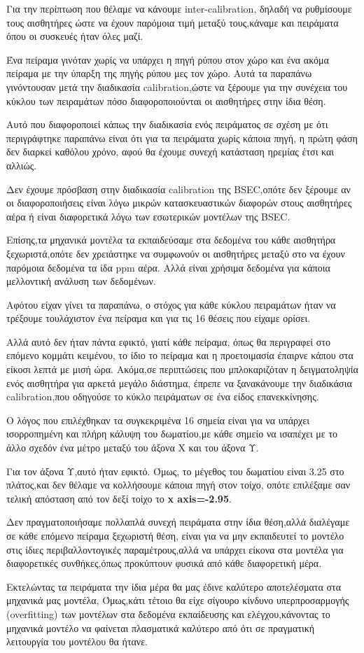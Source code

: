 Για την περίπτωση που θέλαμε να κάνουμε inter-calibration, δηλαδή να ρυθμίσουμε τους
αισθητήρες ώστε να έχουν παρόμοια τιμή μεταξύ τους,κάναμε και πειράματα
όπου οι συσκευές ήταν όλες μαζί.

Ένα πείραμα γινόταν χωρίς να υπάρχει η πηγή ρύπου στον χώρο και ένα ακόμα πείραμα με
την ύπαρξη της πηγής ρύπου μες τον χώρο.
Αυτά τα παραπάνω γινόντουσαν μετά την διαδικασία calibration,ώστε να ξέρουμε για την
συνέχεια του κύκλου των πειραμάτων πόσο διαφοροποιούνται οι αισθητήρες στην ίδια
θέση.

Αυτό που διαφοροποιεί κάπως την διαδικασία ενός πειράματος σε σχέση με ότι
περιγράφτηκε παραπάνω είναι ότι για τα πειράματα χωρίς κάποια πηγή,
η πρώτη φάση δεν διαρκεί καθόλου χρόνο, αφού θα έχουμε συνεχή κατάσταση ηρεμίας
έτσι και αλλιώς.

Δεν έχουμε πρόσβαση στην διαδικασία calibration της BSEC,οπότε δεν ξέρουμε αν οι
διαφοροποιήσεις είναι λόγω μικρών κατασκευαστικών διαφορών στους αισθητήρες αέρα ή
είναι διαφορετικά λόγω των εσωτερικών μοντέλων της BSEC.

Επίσης,τα μηχανικά μοντέλα τα εκπαιδεύσαμε στα δεδομένα του κάθε αισθητήρα
ξεχωριστά,οπότε δεν χρειάστηκε να συμφωνούν οι αισθητήρες μεταξύ στο να έχουν
παρόμοια δεδομένα τα ίδα ppm αέρα.
Αλλά είναι χρήσιμα δεδομένα για κάποια μελλοντική ανάλυση των δεδομένων.

Αφότου είχαν γίνει τα παραπάνω, ο στόχος για κάθε κύκλου πειραμάτων ήταν να τρέξουμε
τουλάχιστον ένα πείραμα και για τις 16 θέσεις που είχαμε ορίσει.

Αλλά αυτό δεν ήταν πάντα εφικτό, γιατί κάθε πείραμα, όπως θα περιγραφεί στο επόμενο
κομμάτι κειμένου, το ίδιο το πείραμα και η προετοιμασία έπαιρνε κάπου στα είκοσι λεπτά
με μισή ώρα.
Ακόμα,σε περιπτώσεις που μπλοκαριζόταν η δειγματοληψία ενός αισθητήρα για αρκετά
μεγάλο διάστημα, έπρεπε να ξανακάνουμε την διαδικάσια calibration,που οδηγούσε το
κύκλο πειράματων σε ένα είδος επανεκκίνησης.

Ο λόγος που επιλέχθηκαν τα συγκεκριμένα 16 σημεία είναι για να υπάρχει ισορροπημένη  και
πλήρη κάλυψη του δωματίου,με κάθε σημείο να ισαπέχει με το άλλο σχεδόν ένα μέτρο
μεταξύ του άξονα Χ και του άξονα Υ.

Για τον άξονα Υ,αυτό ήταν εφικτό.
Όμως, το μέγεθος του δωματίου είναι 3.25 στο πλάτος,και δεν θέλαμε να κολλήσουμε
κάποια πηγή στον τοίχο, οπότε επιλέξαμε σαν τελική απόσταση από τον δεξί τοίχο το
\textbf{x axis=-2.95}.

Δεν πραγματοποιήσαμε πολλαπλά συνεχή πειράματα στην ίδια θέση,αλλά διαλέγαμε σε κάθε επόμενο πείραμα ξεχωριστή θέση,
είναι για να μην εκπαιδευτεί το μοντέλο στις ίδιες περιβαλλοντογικές παραμέτρους,αλλά να υπάρχει
είκονα στα μοντέλα για διαφορετικές συνθήκες,όπως προκύπτουν φυσικά από κάθε διαφορετική μέρα.

Εκτελώντας τα πειράματα την ίδια μέρα θα μας έδινε καλύτερο αποτελέσματα στα μηχανικά μας μοντέλα,
Όμως,κάτι τέτοιο θα είχε σίγουρο κίνδυνο υπερπροσαρμογής (overfitting) των μοντέλων στα δεδομένα εκπαίδευσης
και ελέγχου,κάνοντας το μηχανικά μοντέλο να φαίνεται πλασματικά καλύτερο από ότι σε πραγματική λειτουργία του μοντέλου θα ήτανε.

